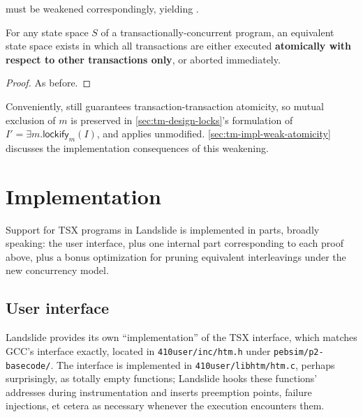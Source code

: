 { must be weakened correspondingly, yielding .
\vspace{1em}

\begin{theorem}
	\label{thm:atom-weak}
	For any state space $S$ of a transactionally-concurrent program,
	an equivalent state space exists in which all transactions are either executed
	{\bf atomically
	with respect to other transactions only},
	or aborted immediately.
\end{theorem}

\begin{proof}
	As before.
\end{proof}

Conveniently,
 still guarantees transaction-transaction atomicity,
so mutual exclusion of $m$ is preserved
in \cref{sec:tm-design-locks}'s formulation of
$I' = \exists m. \mathsf{lockify}_m(I)$,
and
 applies unmodified.
\cref{sec:tm-impl-weak-atomicity}
discusses the implementation consequences of this weakening.}


\section{Implementation}
\label{sec:tm-implementation}

Support for TSX programs in Landslide is implemented in  parts, broadly speaking:
the user interface,
plus one internal part corresponding to each proof above,
plus a bonus optimization for pruning equivalent interleavings under the new concurrency model.

\subsection{User interface}
\label{sec:tm-interface}

Landslide provides its own ``implementation'' of the TSX interface,
which matches GCC's interface exactly,
located in {\tt 410user/inc/htm.h}
under {\tt pebsim/p2-basecode/}.
The interface is implemented in {\tt 410user/libhtm/htm.c},
perhaps surprisingly, as totally empty functions;
Landslide hooks these functions' addresses during instrumentation
and inserts preemption points, failure injections,
et cetera as necessary whenever the execution encounters them.

